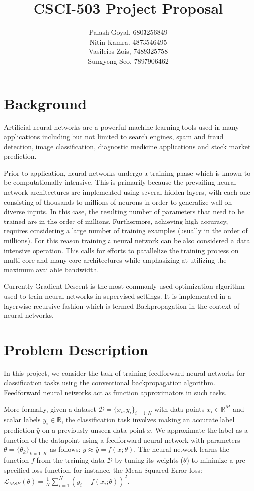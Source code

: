 \documentclass[11pt,letterpaper]{article}
\title{CSCI-503 Project Proposal}
\author{Palash Goyal, 6803256849 \\
        Nitin Kamra, 4873546495 \\
        Vasileios Zois, 7489325758 \\
        Sungyong Seo, 7897906462 }
\begin{document}
\maketitle

\section{Background}

Artificial neural networks are a powerful machine learning tools used in many applications including but not limited to search engines, spam and fraud detection, image classification, diagnostic medicine applications and stock market prediction.

Prior to application, neural networks undergo a training phase which is known to be computationally intensive. This is primarily because the prevailing neural network architectures are implemented using several hidden layers, with each one consisting of thousands to millions of neurons in order to generalize well on diverse inputs. In this case, the resulting number of parameters that need to be trained are in the order of millions. Furthermore, achieving high accuracy, requires considering a large number of training examples (usually in the order of millions). For this reason training a neural network can be also considered a data intensive operation. This calls for efforts to parallelize the training process on multi-core and many-core architectures while emphasizing at utilizing the maximum available bandwidth.

Currently Gradient Descent is the most commonly used optimization algorithm used to train neural networks in supervised settings. It is implemented in a layerwise-recursive fashion which is termed Backpropagation in the context of neural networks.
  
\section{Problem Description}

In this project, we consider the task of training feedforward neural networks for classification tasks using the conventional backpropagation algorithm. Feedforward neural networks act as function approximators in such tasks.

More formally, given a dataset $ \mathcal{D} = \{x_i,y_i\}_{i=1:N}$ with data points $x_i \in \mathbb{R}^M$ and scalar labels $y_i \in \mathbb{R}$, the classification task involves making an accurate label prediction $\hat{y}$ on a previously unseen data point $x$. We approximate the label as a function of the datapoint using a feedforward neural network with parameters $\theta = \{\theta_k\}_{k=1:K}$ as follows: $y \approx \hat{y} = f(x; \theta)$.
The neural network learns the function $f$ from the training data $\mathcal{D}$ by tuning its weights ($\theta$) to minimize a pre-specified loss function, for instance, the Mean-Squared Error loss: $\mathcal{L}_{MSE} (\theta) = \frac{1}{N}\sum_{i=1}^N ( y_i - f(x_i; \theta))^2$.
\end{document}
